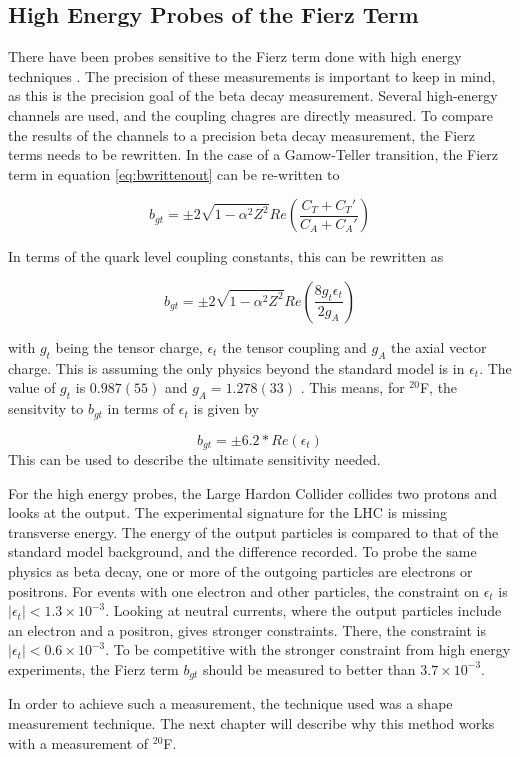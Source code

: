 \documentclass[../MaxHughesThesis.tex]{subfiles}
\begin{document}
\subsection{High Energy Probes of the Fierz Term}

There have been probes sensitive to the Fierz term done with high energy techniques \cite{Gon19}.
The precision of these measurements is important to keep in mind, as this is the precision goal of the beta decay measurement.
Several high-energy channels are used, and the coupling chagres are directly measured.
To compare the results of the channels to a precision beta decay measurement, the Fierz terms needs to be rewritten.
In the case of a Gamow-Teller transition, the Fierz term in equation \ref{eq:bwrittenout} can be re-written to %

\begin{equation}
	b_{gt} = \pm 2 \sqrt{1 - \alpha^{2} Z^{2}} Re(\frac{C_{T} + C_{T}'}{C_{A} + C_{A}'})
	\label{eq:bgt}
\end{equation}

In terms of the quark level coupling constants, this can be rewritten as \cite{Gon19} %

\begin{equation}
	b_{gt} = \pm 2 \sqrt{1 - \alpha^{2} Z^{2}} Re(\frac{8 g_{t} \epsilon_{t}}{2 g_{A}})
	\label{eq:bgtquarklevel}
\end{equation}

with $g_{t}$ being the tensor charge, $\epsilon_{t}$ the tensor coupling and $g_{A}$ the axial vector charge.
This is assuming the only physics beyond the standard model is in $\epsilon_{t}$.
The value of $g_{t}$ is $0.987(55)$ and $g_{A} = 1.278 (33)$ \cite{Gon19}.
This means, for $^{20}$F, the sensitvity to $b_{gt}$ in terms of $\epsilon_{t}$ is given by %

\begin{equation}
	b_{gt} = \pm 6.2 * Re(\epsilon_{t})
	\label{eq:bgtpropor}
\end{equation}
This can be used to describe the ultimate sensitivity needed.

For the high energy probes, the Large Hardon Collider collides two protons and looks at the output. 
The experimental signature for the LHC is missing transverse energy.
The energy of the output particles is compared to that of the standard model background, and the difference recorded.
To probe the same physics as beta decay, one or more of the outgoing particles are electrons or positrons.
For events with one electron and other particles, the constraint on $\epsilon_{t}$ is $|\epsilon_{t}| < 1.3 \times 10^{-3}$.
Looking at neutral currents, where the output particles include an electron and a positron, gives stronger constraints.
There, the constraint is $|\epsilon_{t}| < 0.6 \times 10^{-3}$.
To be competitive with the stronger constraint from high energy experiments, the Fierz term $b_{gt}$ should be measured to better than $3.7 \times 10^{-3}$. 


In order to achieve such a measurement, the technique used was a shape measurement technique.
The next chapter will describe why this method works with a measurement of $^{20}$F.
\end{document}
